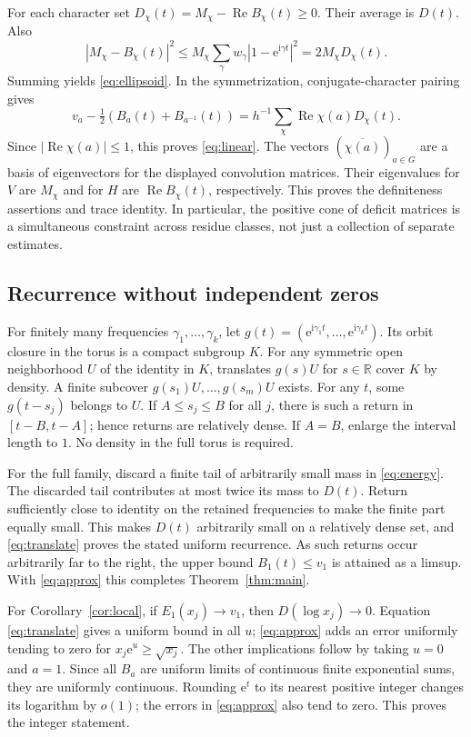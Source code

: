 \documentclass[11pt]{article}
\theoremstyle{remark}\newtheorem{remark}[theorem]{Remark}
\newcommand{\Rea}{\operatorname{Re}}
\newcommand{\e}{\mathrm{e}}
\newcommand{\ii}{\mathrm{i}}
\begin{document}
For each character set $D_\chi(t)=M_\chi-\Rea B_\chi(t)\ge0$. Their average is $D(t)$. Also
\[
 |M_\chi-B_\chi(t)|^2
 \le M_\chi\sum_\gamma w_\gamma|1-\e^{\ii\gamma t}|^2=2M_\chi D_\chi(t).
\]
Summing yields \eqref{eq:ellipsoid}. In the symmetrization, conjugate-character pairing gives
\[
 v_a-\tfrac12(B_a(t)+B_{a^{-1}}(t))
 =h^{-1}\sum_\chi \Rea\chi(a)D_\chi(t).
\]
Since $|\Rea\chi(a)|\le1$, this proves \eqref{eq:linear}. The vectors $(\overline{\chi(a)})_{a\in G}$ are a basis of eigenvectors for the displayed convolution matrices. Their eigenvalues for $V$ are $M_\chi$ and for $H$ are $\Rea B_\chi(t)$, respectively. This proves the definiteness assertions and trace identity. In particular, the positive cone of deficit matrices is a simultaneous constraint across residue classes, not just a collection of separate estimates.

\subsection*{Recurrence without independent zeros}
For finitely many frequencies $\gamma_1,\ldots,\gamma_k$, let $g(t)=(\e^{\ii\gamma_1t},\ldots,\e^{\ii\gamma_kt})$. Its orbit closure in the torus is a compact subgroup $K$. For any symmetric open neighborhood $U$ of the identity in $K$, translates $g(s)U$ for $s\in\mathbb R$ cover $K$ by density. A finite subcover $g(s_1)U,\ldots,g(s_m)U$ exists. For any $t$, some $g(t-s_j)$ belongs to $U$. If $A\le s_j\le B$ for all $j$, there is such a return in $[t-B,t-A]$; hence returns are relatively dense. If $A=B$, enlarge the interval length to $1$. No density in the full torus is required.

For the full family, discard a finite tail of arbitrarily small mass in \eqref{eq:energy}. The discarded tail contributes at most twice its mass to $D(t)$. Return sufficiently close to identity on the retained frequencies to make the finite part equally small. This makes $D(t)$ arbitrarily small on a relatively dense set, and \eqref{eq:translate} proves the stated uniform recurrence. As such returns occur arbitrarily far to the right, the upper bound $B_1(t)\le v_1$ is attained as a limsup. With \eqref{eq:approx} this completes Theorem~\ref{thm:main}.

For Corollary~\ref{cor:local}, if $E_1(x_j)\to v_1$, then $D(\log x_j)\to0$. Equation \eqref{eq:translate} gives a uniform bound in all $u$; \eqref{eq:approx} adds an error uniformly tending to zero for $x_j\e^u\ge\sqrt{x_j}$. The other implications follow by taking $u=0$ and $a=1$. Since all $B_a$ are uniform limits of continuous finite exponential sums, they are uniformly continuous. Rounding $\e^t$ to its nearest positive integer changes its logarithm by $o(1)$; the errors in \eqref{eq:approx} also tend to zero. This proves the integer statement.
\end{document}
